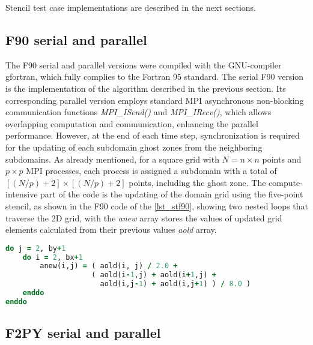 Stencil test case implementations are described in the next sections.

%
%
%
\subsection{F90 serial and parallel} %
\label{sec_stenimplf90}

The F90 serial and parallel versions were compiled with the GNU-compiler gfortran, which fully complies to the Fortran 95 standard. The serial F90 version is the implementation of the algorithm described in the previous section. Its corresponding parallel version employs standard MPI asynchronous non-blocking communication functions \textit {MPI\_ISend()} and \textit {MPI\_IRecv()}, which allows overlapping computation and communication, enhancing the parallel performance. However, at the end of each time step, synchronization is required for the updating of each subdomain ghost zones from the neighboring subdomains. As already mentioned, for a square grid with $N = n \times n $ points and $p \times p$ MPI processes, each process is assigned a subdomain with a total of $[(N/p)+2] \times [(N/p)+2]$ points, including the ghost zone. The compute-intensive  part of the code is the updating of the domain grid using the five-point stencil, as shown in the F90 code of the \autoref {lst_stf90}, showing two nested loops that traverse the 2D grid, with the \textit {anew} array stores the values of updated grid elements calculated from their previous values \textit {aold} array.

\begin{lstlisting}[float=hbt, language=Fortran, label={lst_stf90}, caption={Compute-intensive part of the Stencil test case F90 code.}]
do j = 2, by+1
    do i = 2, bx+1
        anew(i,j) = ( aold(i, j) / 2.0 +
                    ( aold(i-1,j) + aold(i+1,j) +
                      aold(i,j-1) + aold(i,j+1) ) / 8.0 )
    enddo
enddo
\end{lstlisting}

%
%
%
\subsection{F2PY serial and parallel} %
\label{sec_stenimplf2py}

